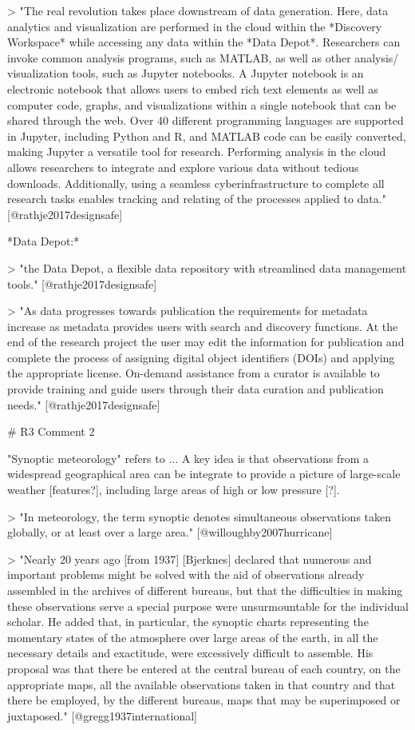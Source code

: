 > "The real revolution takes place downstream of data generation. Here, data 
analytics and visualization are performed in the cloud within the *Discovery
Workspace* while accessing any data within the *Data Depot*. Researchers can 
invoke common analysis programs, such as MATLAB, as well as other analysis/
visualization tools, such as Jupyter notebooks. A Jupyter notebook is an 
electronic notebook that allows users to embed rich text elements as well
as computer code, graphs, and visualizations within a single notebook that
can be shared through the web. Over 40 different programming languages are 
supported in Jupyter, including Python and R, and MATLAB code can be easily 
converted, making Jupyter a versatile tool for research. Performing analysis in 
the cloud allows researchers to integrate and explore various data without
tedious downloads. Additionally, using a seamless cyberinfrastructure to 
complete all research tasks enables tracking and relating of the processes 
applied to data." [@rathje2017designsafe]

*Data Depot:*

> "the Data Depot, a flexible data repository with streamlined data management
tools." [@rathje2017designsafe]

> "As data progresses towards publication the requirements for metadata 
increase as metadata provides users with search and discovery functions. At
the end of the research project the user may edit the information for 
publication and complete the process of assigning digital object identifiers
(DOIs) and applying the appropriate license. On-demand assistance from a 
curator is available to provide training and guide users through their data
curation and publication needs." [@rathje2017designsafe]

# R3 Comment 2

"Synoptic meteorology" refers to ...
A key idea is that observations from a widespread geographical area can be
integrate to provide a picture of large-scale weather [features?], including
large areas of high or low pressure [?].

> "In meteorology, the term synoptic denotes simultaneous observations taken
globally, or at least over a large area." [@willoughby2007hurricane]

> "Nearly 20 years ago [from 1937] [Bjerknes] declared that numerous and 
important problems might be solved with the aid of observations already 
assembled in the archives of different bureaus, but that the difficulties
in making these observations serve a special purpose were unsurmountable
for the individual scholar. He added that, in particular, the synoptic 
charts representing the momentary states of the atmosphere over large
areas of the earth, in all the necessary details and exactitude, were 
excessively difficult to assemble. His proposal was that there be entered
at the central bureau of each country, on the appropriate maps, all the available
observations taken in that country and that there be employed, by the different
bureaus, maps that may be superimposed or juxtaposed." [@gregg1937international]

